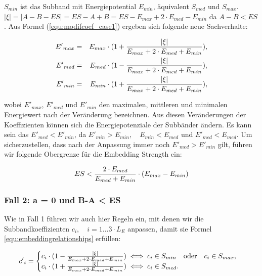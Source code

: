 ${S}_{min}$ ist das Subband mit Energiepotential ${E}_{min}$, äquivalent ${S}_{med}$ und ${S}_{max}$. $|\xi| = |A-B-ES| = ES-A+B = ES - {E}_{max} + 2\cdot {E}_{med} - {E}_{min}$ da $A-B<ES$. Aus Formel (\ref{equ:modifcoef_case1}) ergeben sich folgende neue Sachverhalte:
	 
	 \begin{eqnarray*}
		 {E'}_{max} & = & {E}_{max} \cdot (1 + { |\xi| \over {{E}_{max} + 2\cdot {E}_{med} + {E}_{min}} }),
		 \\ 
		 {E'}_{med} & = & {E}_{med} \cdot (1 - { |\xi| \over {{E}_{max} + 2\cdot {E}_{med} + {E}_{min}} }),
		 \\
		 {E'}_{min} & = & {E}_{min} \cdot (1 + { |\xi| \over {{E}_{max} + 2\cdot {E}_{med} + {E}_{min}} }),
	\end{eqnarray*}	 
	 
wobei ${E'}_{max}$, ${E'}_{med}$ und ${E'}_{min}$ den maximalen, mittleren und minimalen Energiewert nach der Veränderung bezeichnen. Aus diesen Veränderungen der Koeffizienten können sich die Energiepotenziale der Subbänder ändern. Es kann sein das ${E'}_{med} < {E'}_{min}$, da ${E'}_{min}>{E}_{min},\quad {E}_{min}<{E}_{med}$ und ${E'}_{med}<{E}_{med}$. Um sicherzustellen, dass nach der Anpassung immer noch ${E'}_{med} > {E'}_{min}$ gilt, führen wir folgende Obergrenze für die Embedding Strength ein:

	\begin{equation}
		ES < { 2 \cdot {E}_{med} \over {E}_{med} + {E}_{min} } \cdot ( {E}_{max} - {E}_{min} )
		\label{equ:embeddingstrengthconstraint_case1}
	\end{equation}

\subsubsection{Fall 2: a = 0 und B-A < ES}

Wie in Fall 1 führen wir auch hier Regeln ein, mit denen wir die Subbandkoeffizienten ${c}_{i},\quad i=1\dots{3\cdot{L}_{E}}$ anpassen, damit sie Formel \ref{equ:embeddingrelationships} erfüllen:

	 \begin{equation}
		 {c'}_{i} = \begin{cases}
    	 				{c}_{i} \cdot ( 1 - { |\xi| \over {{E}_{max} + 2\cdot {E}_{med} + {E}_{min}} }) \iff {c}_{i} \in {S}_{min} \quad\mbox{oder}\quad {c}_{i} \in {S}_{max}, 
						\\
    					{c}_{i} \cdot ( 1 + { |\xi| \over {{E}_{max} + 2\cdot {E}_{med} + {E}_{min}} }) \iff {c}_{i} \in {S}_{med}.
  				  	\end{cases}
		  \label{equ:modifcoef_case2}
	 \end{equation}
	 
